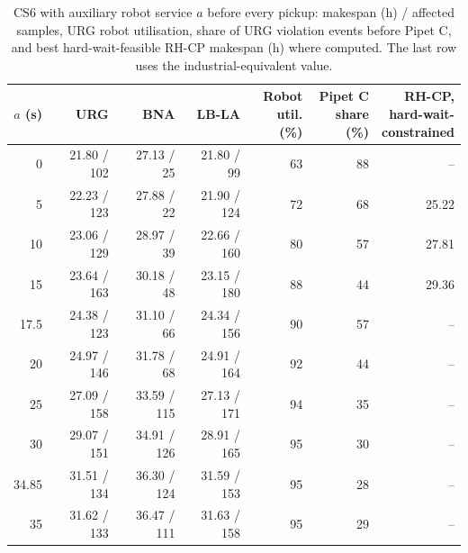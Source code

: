 \begin{table}[tbp]
\caption{CS6 with auxiliary robot service $a$ before every pickup: makespan (h) / affected samples, URG robot utilisation, share of URG violation events before Pipet C, and best hard-wait-feasible RH-CP makespan (h) where computed. The last row uses the industrial-equivalent value.\label{tab:robot}}
\centering
\footnotesize
\setlength{\tabcolsep}{3pt}
\begin{tabular*}{\textwidth}{@{\extracolsep{\fill}}rrrrrrr@{}}
\toprule
$a$ (s) & URG & BNA & LB-LA & \shortstack{Robot\\util. (\%)} & \shortstack{Pipet C\\share (\%)} & \shortstack{RH-CP,\\hard-wait-\\constrained}\\
\midrule
0 & 21.80 / 102 & 27.13 / 25 & 21.80 / 99 & 63 & 88 & --\\
5 & 22.23 / 123 & 27.88 / 22 & 21.90 / 124 & 72 & 68 & 25.22\\
10 & 23.06 / 129 & 28.97 / 39 & 22.66 / 160 & 80 & 57 & 27.81\\
15 & 23.64 / 163 & 30.18 / 48 & 23.15 / 180 & 88 & 44 & 29.36\\
17.5 & 24.38 / 123 & 31.10 / 66 & 24.34 / 156 & 90 & 57 & --\\
20 & 24.97 / 146 & 31.78 / 68 & 24.91 / 164 & 92 & 44 & --\\
25 & 27.09 / 158 & 33.59 / 115 & 27.13 / 171 & 94 & 35 & --\\
30 & 29.07 / 151 & 34.91 / 126 & 28.91 / 165 & 95 & 30 & --\\
34.85 & 31.51 / 134 & 36.30 / 124 & 31.59 / 153 & 95 & 28 & --\\
35 & 31.62 / 133 & 36.47 / 111 & 31.63 / 158 & 95 & 29 & --\\
\bottomrule
\end{tabular*}
\end{table}
